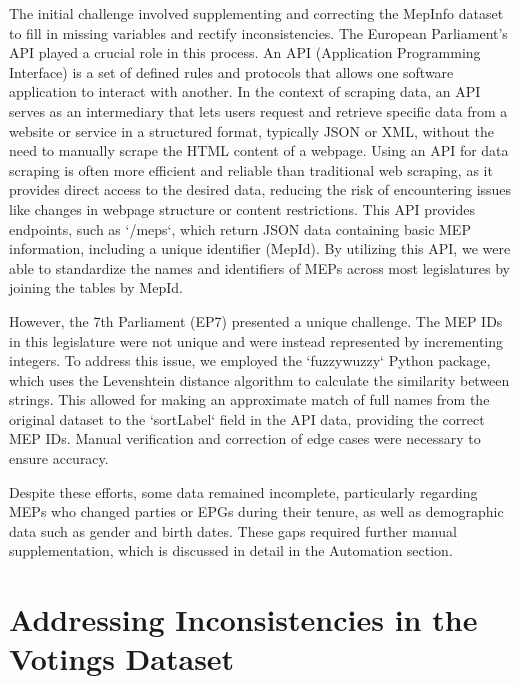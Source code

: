 \documentclass[a4paper,12pt]{report}
\begin{document}
    The initial challenge involved supplementing and correcting the MepInfo dataset to fill in missing variables
    and
    rectify inconsistencies.
    The European Parliament's API played a crucial role in this process. An API
    (Application
    Programming Interface) is a set of defined rules and protocols that allows one software application to
    interact with
    another.
    In the context of scraping data, an API serves as an intermediary that lets users request and
    retrieve
    specific data from a website or service in a structured format, typically JSON or XML, without the need to
    manually
    scrape the HTML content of a webpage.
    Using an API for data scraping is often more efficient and reliable than traditional web scraping, as it
    provides
    direct access to the desired data, reducing the risk of encountering issues like changes in webpage
    structure or
    content restrictions.
    This API provides endpoints, such as `/meps`, which return JSON data containing basic
    MEP
    information, including a unique identifier (MepId).
    By utilizing this API, we were able to standardize the
    names and
    identifiers of MEPs across most legislatures by joining the tables by MepId.

    However, the 7th Parliament (EP7) presented a unique challenge.
    The MEP IDs in this legislature were not
    unique and
    were instead represented by incrementing integers.
    To address this issue, we employed the `fuzzywuzzy`
    Python
    package, which uses the Levenshtein distance algorithm to calculate the similarity between strings. This
    allowed for
    making an approximate match of full names from the original dataset to the `sortLabel` field in the API
    data,
    providing the correct MEP IDs. Manual verification and correction of edge cases were necessary to ensure
    accuracy.

    Despite these efforts, some data remained incomplete, particularly regarding MEPs who changed parties or
    EPGs during
    their tenure, as well as demographic data such as gender and birth dates. These gaps required further manual
    supplementation, which is discussed in detail in the Automation section.


    \section{Addressing Inconsistencies in the Votings Dataset}
    \label{sec:addressing-inconsistencies-in-the-votings-dataset}
\end{document}
